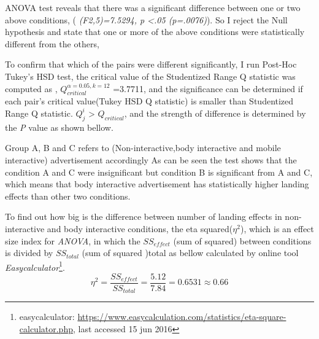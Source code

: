 ANOVA test reveals that there was a significant difference between one or two above conditions, ( \emph{(F2,5)=7.5294, p <.05 (p=.0076)}). So I reject the Null hypothesis and state that one or more of the above conditions were statistically different from the others, 

To confirm that which of the pairs were different significantly, I run Post-Hoc Tukey’s HSD test, the critical value of the Studentized Range Q statistic was computed as , ${Q}_{critical}^{\alpha=0.05,k=12}$ =3.7711, and the significance can be determined if each pair’s critical value(Tukey HSD Q statistic) is smaller than Studentized Range Q statistic. ${Q}_{j}^{i }$ > ${Q}_{critical}$, and the strength of difference is determined by the \emph{P} value as shown bellow.

\begin{table}[H]
\caption{Post-Hoc Tukey’s HSD results}
\label{tab:landing-non-posthoctukey}
\centering
{}
\end{table}


Group A, B and C refers to (Non-interactive,body interactive and mobile interactive) advertisement accordingly As can be seen the test shows that the condition A and C were insignificant but condition B is significant from A and C, which means that body interactive advertisement has statistically higher landing effects than other two conditions.

To find out how big is the difference between number of landing effects in non-interactive and body interactive conditions, the eta squared(${\eta}^2$), which is an effect size index for \emph{ANOVA}, in which the $SS_{effect}$ (sum of squared) between conditions is divided by $SS_{total}$  (sum of squared )total as bellow calculated by online tool \emph{Easycalculator}\footnote{easycalculator: \url{https://www.easycalculation.com/statistics/eta-square-calculator.php}, last accessed 15 jun 2016}.
\[
{\eta}^2 = \frac{{SS}_{effect}}{{SS}_{total}} = \frac{5.12}{7.84} = 0.6531 \approx 0.66
\]


